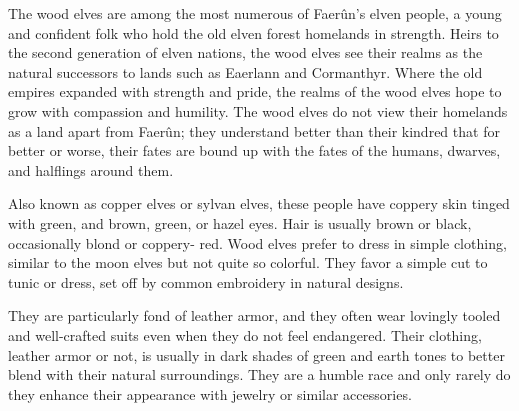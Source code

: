
The wood elves are among the most numerous of Faerûn’s elven people, a young and confident folk who hold the old elven forest homelands in strength. Heirs to the second generation of elven nations, the wood elves see their realms as the natural successors to lands such as Eaerlann and Cormanthyr. Where the old empires expanded with strength and pride, the realms of the wood elves hope to grow with compassion and humility. The wood elves do not view their homelands as a land apart from Faerûn; they understand better than their kindred that for better or worse, their fates are bound up with the fates of the humans, dwarves, and halflings around them.

Also known as copper elves or sylvan elves, these people have coppery skin tinged with green, and brown, green, or hazel eyes. Hair is usually brown or black, occasionally blond or coppery- red. Wood elves prefer to dress in simple clothing, similar to the moon elves but not quite so colorful. They favor a simple cut to tunic or dress, set off by common embroidery in natural designs.

They are particularly fond of leather armor, and they often wear lovingly tooled and well-crafted suits even when they do not feel endangered. Their clothing, leather armor or not, is usually in dark shades of green and earth tones to better blend with their natural surroundings. They are a humble race and only rarely do they enhance their appearance with jewelry or similar accessories.

